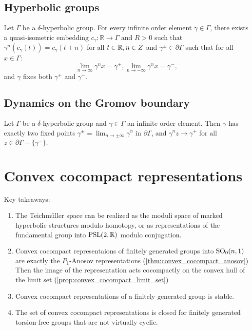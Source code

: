 \documentclass{report}
\begin{document}
\subsection{Hyperbolic groups}
\begin{proposition}
    Let $\Gamma$ be a $\delta$-hyperbolic group.
    For every infinite order element $\gamma \in \Gamma$, there exists a quasi-isometric embedding $c_\gamma : \mathbb R \to \Gamma$ and $R>0$ such that $\gamma^n(c_\gamma(t)) = c_\gamma(t + n)$ for all $t \in \mathbb R, n \in \mathbb \mathbb Z$ and $\gamma^\pm \in \partial \Gamma$ such that for all $x \in \Gamma$:
    \[
    \lim_{n \to \infty} \gamma^n x = \gamma^+, \lim_{n \to -\infty} \gamma^n x = \gamma^-,
    \]
    and $\gamma$ fixes both $\gamma^+$ and $\gamma^-$.
\end{proposition}

\subsection{Dynamics on the Gromov boundary}
\begin{proposition}
    Let $\Gamma$ be a $\delta$-hyperbolic group and $\gamma \in \Gamma$ an infinite order element.
    Then $\gamma$ has exactly two fixed points $\gamma^\pm = \lim_{n \to \pm \infty} \gamma^n$ in $\partial \Gamma$, and $\gamma^n z \to \gamma^+$ for all $z \in \partial \Gamma - \{\gamma^-\}$.
\end{proposition}

\section{Convex cocompact representations}

\begin{center}
    Key takeaways:
    \begin{enumerate}
        \item The Teichmüller space can be realized as the moduli space of marked hyperbolic structures modulo homotopy, or as representations of the fundamental group into $\operatorname{{\mathrm{PSL}}}(2, \mathbb R)$ modulo conjugation.
        \item Convex cocompact representaions of finitely generated groups into $\operatorname{{\mathrm{SO}}}_0(n,1)$ are exactly the $P_1$-Anosov representations (\cref{thm:convex_cocompact_anosov})
        Then the image of the representation acts cocompactly on the convex hull of the limit set (\cref{prop:convex_cocompact_limit_set})
        \item Convex cocompact representations of a finitely generated group is stable.
        \item The set of convex cocompact representations is closed for finitely generated torsion-free groups that are not virtually cyclic.
    \end{enumerate}    
\end{center}
\end{document}
